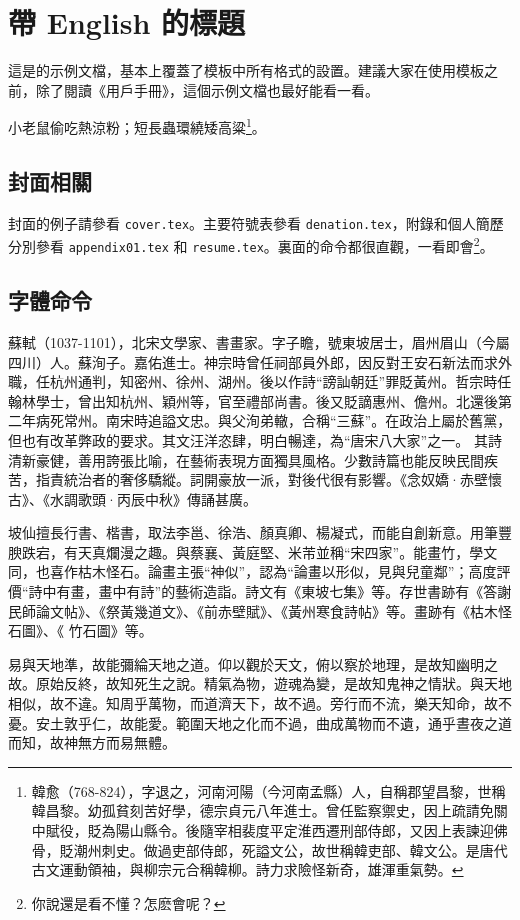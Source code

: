 \chapter{帶 English 的標題}
\label{cha:intro}

這是的示例文檔，基本上覆蓋了模板中所有格式的設置。建議大家在使用模板之前，除了閱讀《用戶手冊》，這個示例文檔也最好能看一看。

小老鼠偷吃熱涼粉；短長蟲環繞矮高粱\footnote{韓愈（768-824），字退之，河南河陽（今河南孟縣）人，自稱郡望昌黎，世稱韓昌黎。幼孤貧刻苦好學，德宗貞元八年進士。曾任監察禦史，因上疏請免關中賦役，貶為陽山縣令。後隨宰相裴度平定淮西遷刑部侍郎，又因上表諫迎佛骨，貶潮州刺史。做過吏部侍郎，死謚文公，故世稱韓吏部、韓文公。是唐代古文運動領袖，與柳宗元合稱韓柳。詩力求險怪新奇，雄渾重氣勢。}。


\section{封面相關}
封面的例子請參看 \texttt{cover.tex}。主要符號表參看 \texttt{denation.tex}，附錄和個人簡歷分別參看 \texttt{appendix01.tex} 和 \texttt{resume.tex}。裏面的命令都很直觀，一看即會\footnote{你說還是看不懂？怎麽會呢？}。

\section{字體命令}
\label{sec:first}

蘇軾（1037-1101），北宋文學家、書畫家。字子瞻，號東坡居士，眉州眉山（今屬四川）人。蘇洵子。嘉佑進士。神宗時曾任祠部員外郎，因反對王安石新法而求外職，任杭州通判，知密州、徐州、湖州。後以作詩“謗訕朝廷”罪貶黃州。哲宗時任翰林學士，曾出知杭州、穎州等，官至禮部尚書。後又貶謫惠州、儋州。北還後第二年病死常州。南宋時追謚文忠。與父洵弟轍，合稱“三蘇”。在政治上屬於舊黨，但也有改革弊政的要求。其文汪洋恣肆，明白暢達，為“唐宋八大家”之一。  其詩清新豪健，善用誇張比喻，在藝術表現方面獨具風格。少數詩篇也能反映民間疾苦，指責統治者的奢侈驕縱。詞開豪放一派，對後代很有影響。《念奴嬌·赤壁懷古》、《水調歌頭·丙辰中秋》傳誦甚廣。

坡仙擅長行書、楷書，取法李邕、徐浩、顏真卿、楊凝式，而能自創新意。用筆豐腴跌宕，有天真爛漫之趣。與蔡襄、黃庭堅、米芾並稱“宋四家”。能畫竹，學文同，也喜作枯木怪石。論畫主張“神似”，認為“論畫以形似，見與兒童鄰”；高度評價“詩中有畫，畫中有詩”的藝術造詣。詩文有《東坡七集》等。存世書跡有《答謝民師論文帖》、《祭黃幾道文》、《前赤壁賦》、《黃州寒食詩帖》等。畫跡有《枯木怪石圖》、《  竹石圖》等。

易與天地準，故能彌綸天地之道。仰以觀於天文，俯以察於地理，是故知幽明之故。原始反終，故知死生之說。精氣為物，遊魂為變，是故知鬼神之情狀。與天地相似，故不違。知周乎萬物，而道濟天下，故不過。旁行而不流，樂天知命，故不憂。安土敦乎仁，故能愛。範圍天地之化而不過，曲成萬物而不遺，通乎晝夜之道而知，故神無方而易無體。

